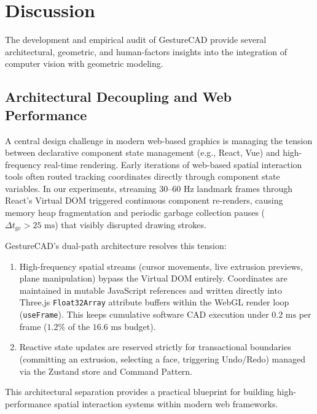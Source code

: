 \section{Discussion}
\label{sec:discussion}

The development and empirical audit of GestureCAD provide several architectural, geometric, and human-factors insights into the integration of computer vision with geometric modeling.

\subsection{Architectural Decoupling and Web Performance}
A central design challenge in modern web-based graphics is managing the tension between declarative component state management (e.g., React, Vue) and high-frequency real-time rendering. Early iterations of web-based spatial interaction tools often routed tracking coordinates directly through component state variables. In our experiments, streaming 30--60 Hz landmark frames through React's Virtual DOM triggered continuous component re-renders, causing memory heap fragmentation and periodic garbage collection pauses ($\Delta t_{\text{gc}} > 25\text{ ms}$) that visibly disrupted drawing strokes.

GestureCAD's dual-path architecture resolves this tension:
\begin{enumerate}
    \item High-frequency spatial streams (cursor movements, live extrusion previews, plane manipulation) bypass the Virtual DOM entirely. Coordinates are maintained in mutable JavaScript references and written directly into Three.js \texttt{Float32Array} attribute buffers within the WebGL render loop (\texttt{useFrame}). This keeps cumulative software CAD execution under $0.2\text{ ms}$ per frame ($1.2\%$ of the $16.6\text{ ms}$ budget).
    \item Reactive state updates are reserved strictly for transactional boundaries (committing an extrusion, selecting a face, triggering Undo/Redo) managed via the Zustand store and Command Pattern.
\end{enumerate}
This architectural separation provides a practical blueprint for building high-performance spatial interaction systems within modern web frameworks.

